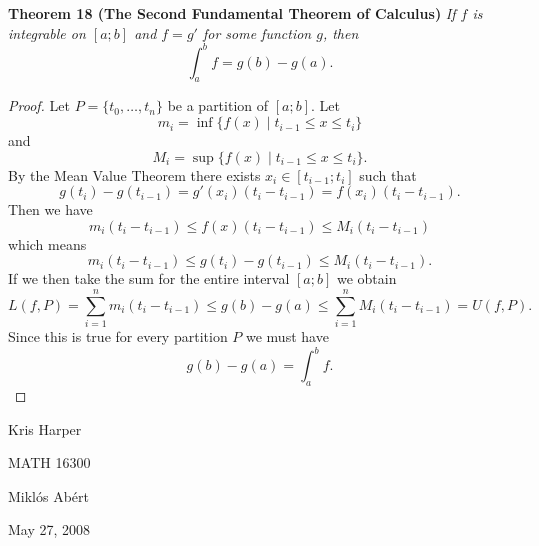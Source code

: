 \documentclass{article}
\begin{document}
\begin{flushleft}
\textbf{Theorem 18 (The Second Fundamental Theorem of Calculus)}
\textsl{If $f$ is integrable on $[a;b]$ and $f=g'$ for some function $g$, then
\[
\int_a^b f = g(b)-g(a).
\]}
\begin{proof}
Let $P = \{t_0, \dots , t_n\}$ be a partition of $[a;b]$. Let
\[
m_i = \inf \{f(x) \mid t_{i-1} \leq x \leq t_i\}
\]
and
\[
M_i = \sup \{f(x) \mid t_{i-1} \leq x \leq t_i\}.
\]
By the Mean Value Theorem there exists $x_i \in [t_{i-1}; t_i]$ such that
\[
g(t_i) - g(t_{i-1}) = g'(x_i) (t_i-t_{i-1}) = f(x_i) (t_i-t_{i-1}).
\]
Then we have
\[
m_i (t_i-t_{i-1}) \leq f(x) (t_i-t_{i-1}) \leq M_i (t_i - t_{i-1})
\]
which means
\[
m_i (t_i-t_{i-1}) \leq g(t_i) - g(t_{i-1}) \leq M_i (t_i - t_{i-1}).
\]
If we then take the sum for the entire interval $[a;b]$ we obtain
\[
L(f,P) = \sum_{i=1}^n m_i (t_i-t_{i-1}) \leq g(b) - g(a) \leq \sum_{i=1}^n M_i (t_i-t_{i-1}) = U(f,P).
\]
Since this is true for every partition $P$ we must have
\[
g(b) - g(a) = \int_a^b f.
\]
\end{proof}

\end{flushleft}

\newpage

\begin{flushright}
Kris Harper

MATH 16300

Mikl\'{o}s Ab\'{e}rt

May 27, 2008
\end{flushright}
\end{document}
